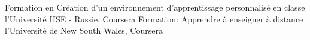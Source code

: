 %
%
%


\begin{scholarship}
	{Formation en Création d'un environnement d'apprentissage personnalisé en classe l'Université HSE - Russie, Coursera} %
	{Formation: Apprendre à enseigner à distance l'Université de New South Wales, Coursera} %
\end{scholarship}
